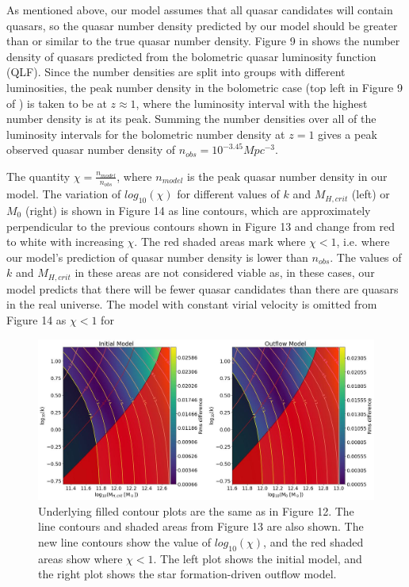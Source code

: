 \documentclass[12pt, twocolumn]{article}%
\begin{document}
As mentioned above, our model assumes that all quasar candidates will contain quasars, so the quasar number density predicted by our model should be greater than or similar to the true quasar number density. Figure 9 in \cite{Hopkins} shows the number density of quasars predicted from the bolometric quasar luminosity function (QLF). Since the number densities are split into groups with different luminosities, the peak number density in the bolometric case (top left in Figure 9 of \citeauthor{Hopkins}) is taken to be at $z\approx1$, where the luminosity interval with the highest number density is at its peak. Summing the number densities over all of the luminosity intervals for the bolometric number density at $z=1$ gives a peak observed quasar number density of $n_{obs}=10^{-3.45}Mpc^{-3}$.\par

The quantity $\chi=\frac{n_{model}}{n_{obs}}$, where $n_{model}$ is the peak quasar number density in our model. The variation of $log_{10}(\chi)$ for different values of $k$ and $M_{H,crit}$ (left) or $M_0$ (right) is shown in Figure 14 as line contours, which are approximately perpendicular to the previous contours shown in Figure 13 and change from red to white with increasing $\chi$. The red shaded areas mark where $\chi<1$, i.e. where our model's prediction of quasar number density is lower than $n_{obs}$. The values of $k$ and $M_{H,crit}$ in these areas are not considered viable as, in these cases, our model predicts that there will be fewer quasar candidates than there are quasars in the real universe. The model with constant virial velocity is omitted from Figure 14 as $\chi<1$ for

\onecolumngrid


\begin{figure}[H]
\centering
\includegraphics[width=\linewidth]{Plot_11_4.jpeg}
\caption{Underlying filled contour plots are the same as in Figure 12. The line contours and shaded areas from Figure 13 are also shown. The new line contours show the value of $log_{10}(\chi)$, and the red shaded areas show where $\chi<1$. The left plot shows the initial model, and the right plot shows the star formation-driven outflow model.}
\label{fig:14}
\end{figure}
\end{document}
